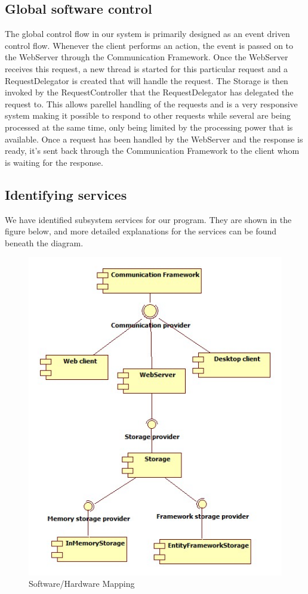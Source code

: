 \subsection{Global software control}
The global control flow in our system is primarily designed as an event driven control flow. Whenever the client performs an action, the event is passed on to the WebServer through the Communication Framework. Once the WebServer receives this request, a new thread is started for this particular request and a RequestDelegator is created that will handle the request. The Storage is then invoked by the RequestController that the RequestDelegator has delegated the request to. This allows parellel handling of the requests and is a very responsive system making it possible to respond to other requests while several are being processed at the same time, only being limited by the processing power that is available. Once a request has been handled by the WebServer and the response is ready, it's sent back through the Communication Framework to the client whom is waiting for the response. 

\subsection{Identifying services}
We have identified subsystem services for our program. They are shown in the figure below, and more detailed explanations for the services can be found beneath the diagram.

\begin{figure}[H]
\includegraphics[scale=0.8]{img/SDD/SubsystemServices.jpg}
\caption{Software/Hardware Mapping}
\label{fig:Subsystem Services}
\end{figure}


